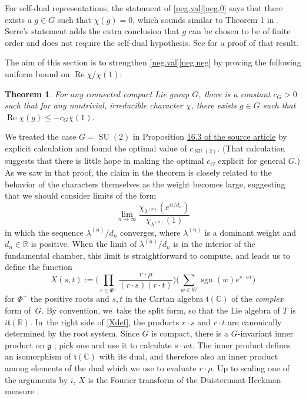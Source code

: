 \documentclass[10pt]{amsart}
\newtheorem{thm}[equation]{Theorem}
\theoremstyle{definition}
\newcommand{\mfg}{\mathfrak{g}}
\newcommand{\mft}{\mathfrak{t}}
\newcommand{\R}{\mathbb{R}}
\newcommand{\C}{\mathbb{C}}
\DeclareMathOperator{\RE}{Re}
\DeclareMathOperator{\SU}{SU}
\DeclareMathOperator{\sgn}{sgn}
\numberwithin{equation}{section}
\begin{document}
For self-dual representations, the statement of \ref{neg.val}\eqref{neg.0} says that there exists a $g \in G$ such that $\chi(g) = 0$, which
sounds similar to Theorem 1 in \cite{Se:trace}. Serre's statement adds the extra conclusion that $g$ can be chosen to be of finite order and does not require the self-dual hypothesis. See \cite{Se:zeros} for a proof of that result.

The aim of this section is to strengthen \ref{neg.val}\eqref{neg.neg} by proving the following uniform
bound on $\RE\chi / \chi(1)$:
\begin{thm} \label{neg.thm}
For any connected compact Lie group $G$, there is a constant $c_G>0$ such that for
any nontrivial, irreducible character $\chi$, there exists $g\in G$ such that
$\RE\chi(g) \le -c_G\chi(1)$.
\end{thm}

We treated the case $G = \SU(2)$ in Proposition \href{https://doi.org/10.5802/jep.310}{16.3 of the source article} by explicit calculation and found the optimal value of $c_{\SU(2)}$. (That calculation suggests that there is little hope in making the optimal $c_G$ explicit for general $G$.)
As we saw in that proof, the claim in the theorem
is closely related to the behavior of the characters themselves as the
weight becomes large, suggesting that we should consider limits of the form
\begin{equation} \label{X.lim}
\lim_{n\to\infty}
\frac{\chi_{\lambda^{(n)}}(e^{it/d_n})}{\chi_{\lambda^{(n)}}(1)}
\end{equation}
in which the sequence $\lambda^{(n)}/d_n$ converges, where $\lambda^{(n)}$ is a dominant weight and $d_n \in \R$ is positive.
When the limit of
$\lambda^{(n)}/d_n$ is in the interior of the fundamental chamber, this
limit is straightforward to compute, and leads us to define the function
\begin{equation} \label{Xdef}
X(s,t):=
\biggl( \prod_{r\in \Phi^+} \frac{r\cdot \rho}{(r\cdot s)(r\cdot t)} \biggr)
\biggl( \sum_{w\in W} \sgn(w) e^{s\cdot wt} \biggr)
\end{equation}
for $\Phi^+$ the positive roots and $s,t$ in the Cartan algebra $\mft(\C)$ of the \emph{complex} form of~$G$. By convention, we~take the
split form, so that the Lie algebra of $T$ is $i{\mft}(\R)$. In~the right side of \eqref{Xdef}, the products $r \cdot s$ and $r \cdot t$ are canonically determined by the root system. Since $G$ is compact, there is a $G$-invariant inner product on $\mfg$ \cite[\S{IX.1.3}, Prop.\,1]{Bou:g7}; pick one and use it to calculate $s \cdot wt$. The inner product defines an isomorphism of $\mft(\C)$ with its dual, and therefore also an inner product among elements of the dual which we use to evaluate $r \cdot \rho$. Up to scaling one of the arguments by $i$, $X$ is the Fourier transform of the Duistermaat-Heckman measure \cite{EtingofRains}.
\end{document}
